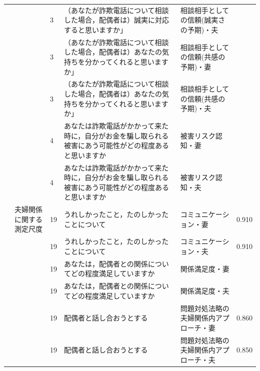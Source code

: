 \begin{landscape}
\begin{longtable}{p{2cm}p{2cm}p{2cm}p{6cm}p{2cm}p{2cm}}
                                 &                                  & 3   & （あなたが詐欺電話について相談した場合，配偶者は）誠実に対応すると思いますか」             & 相談相手としての信頼(誠実さの予期)・夫 &         \\
                                 &                                  & 3   & （あなたが詐欺電話について相談した場合，配偶者は）あなたの気持ちを分かってくれると思いますか」     & 相談相手としての信頼(共感の予期)・妻  &         \\
                                 &                                  & 3   & （あなたが詐欺電話について相談した場合，配偶者は）あなたの気持ちを分かってくれると思いますか」     & 相談相手としての信頼(共感の予期)・夫  &         \\
                                 &                                  & 4   & あなたは詐欺電話がかかって来た時に，自分がお金を騙し取られる被害にあう可能性がどの程度あると思いますか & 被害リスク認知・妻            &         \\
                                 &                                  & 4   & あなたは詐欺電話がかかって来た時に，自分がお金を騙し取られる被害にあう可能性がどの程度あると思いますか & 被害リスク認知・夫            &         \\
                                 & 夫婦関係に関する測定尺度                     & 19  & うれしかったこと，たのしかったことについて                               & コミュニケーション・妻          & 0.910   \\
                                 &                                  & 19  & うれしかったこと，たのしかったことについて                               & コミュニケーション・夫          & 0.910   \\
                                 &                                  & 19  & あなたは，配偶者との関係についてどの程度満足していますか                        & 関係満足度・妻              &         \\
                                 &                                  & 19  & あなたは，配偶者との関係についてどの程度満足していますか                        & 関係満足度・夫              &         \\
                                 &                                  & 19  & 配偶者と話し合おうとする                                        & 問題対処法略の夫婦関係内アプローチ・妻  & 0.860   \\
                                 &                                  & 19  & 配偶者と話し合おうとする                                        & 問題対処法略の夫婦関係内アプローチ・夫  & 0.850   \\

\end{longtable}
\end{landscape}
